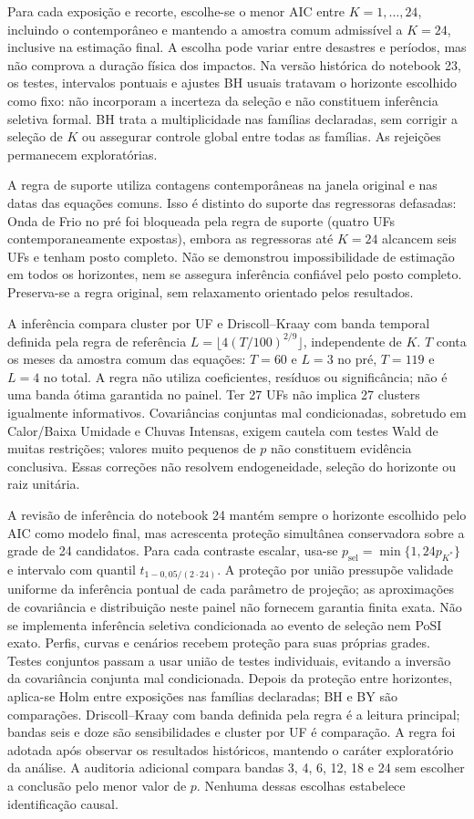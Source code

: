 Para cada exposição e recorte, escolhe-se o menor AIC entre $K=1,\ldots,24$, incluindo o contemporâneo e mantendo a amostra comum admissível a $K=24$, inclusive na estimação final. A escolha pode variar entre desastres e períodos, mas não comprova a duração física dos impactos. Na versão histórica do notebook 23, os testes, intervalos pontuais e ajustes BH usuais tratavam o horizonte escolhido como fixo: não incorporam a incerteza da seleção e não constituem inferência seletiva formal. BH trata a multiplicidade nas famílias declaradas, sem corrigir a seleção de $K$ ou assegurar controle global entre todas as famílias. As rejeições permanecem exploratórias.

A regra de suporte utiliza contagens contemporâneas na janela original e nas datas das equações comuns. Isso é distinto do suporte das regressoras defasadas: Onda de Frio no pré foi bloqueada pela regra de suporte (quatro UFs contemporaneamente expostas), embora as regressoras até $K=24$ alcancem seis UFs e tenham posto completo. Não se demonstrou impossibilidade de estimação em todos os horizontes, nem se assegura inferência confiável pelo posto completo. Preserva-se a regra original, sem relaxamento orientado pelos resultados.

A inferência compara cluster por UF e Driscoll--Kraay com banda temporal definida pela regra de referência $L=\lfloor4(T/100)^{2/9}\rfloor$, independente de $K$. $T$ conta os meses da amostra comum das equações: $T=60$ e $L=3$ no pré, $T=119$ e $L=4$ no total. A regra não utiliza coeficientes, resíduos ou significância; não é uma banda ótima garantida no painel. Ter 27 UFs não implica 27 clusters igualmente informativos. Covariâncias conjuntas mal condicionadas, sobretudo em Calor/Baixa Umidade e Chuvas Intensas, exigem cautela com testes Wald de muitas restrições; valores muito pequenos de $p$ não constituem evidência conclusiva. Essas correções não resolvem endogeneidade, seleção do horizonte ou raiz unitária.

A revisão de inferência do notebook 24 mantém sempre o horizonte escolhido pelo AIC como modelo final, mas acrescenta proteção simultânea conservadora sobre a grade de 24 candidatos. Para cada contraste escalar, usa-se $p_{\mathrm{sel}}=\min\{1,24p_{K^*}\}$ e intervalo com quantil $t_{1-0{,}05/(2\cdot24)}$. A proteção por união pressupõe validade uniforme da inferência pontual de cada parâmetro de projeção; as aproximações de covariância e distribuição neste painel não fornecem garantia finita exata. Não se implementa inferência seletiva condicionada ao evento de seleção nem PoSI exato. Perfis, curvas e cenários recebem proteção para suas próprias grades. Testes conjuntos passam a usar união de testes individuais, evitando a inversão da covariância conjunta mal condicionada. Depois da proteção entre horizontes, aplica-se Holm entre exposições nas famílias declaradas; BH e BY são comparações. Driscoll--Kraay com banda definida pela regra é a leitura principal; bandas seis e doze são sensibilidades e cluster por UF é comparação. A regra foi adotada após observar os resultados históricos, mantendo o caráter exploratório da análise. A auditoria adicional compara bandas 3, 4, 6, 12, 18 e 24 sem escolher a conclusão pelo menor valor de $p$. Nenhuma dessas escolhas estabelece identificação causal.

